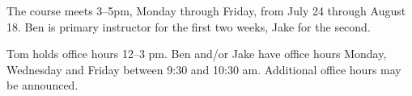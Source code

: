The course meets 3--5pm, Monday through Friday, from  July 24 through August
18. Ben is primary instructor for the first two weeks, Jake for the second.

Tom holds office hours 12--3 pm. Ben and/or Jake
have office hours Monday, Wednesday and Friday between 9:30 and 10:30
am.   Additional office hours may be announced.
